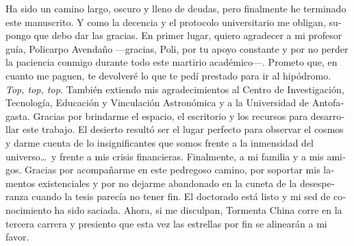 \begin{otherlanguage}{spanish}
Ha sido un camino largo, oscuro y lleno de deudas, pero finalmente he terminado este manuscrito. Y como la decencia y el protocolo universitario me obligan, supongo que debo dar las gracias.
En primer lugar, quiero agradecer a mi profesor guía, Policarpo Avendaño ---gracias, Poli, por tu apoyo constante y por no perder la paciencia conmigo durante todo este martirio académico---. Prometo que, en cuanto me paguen, te devolveré lo que te pedí prestado para ir al hipódromo. \textit{Top, top, top.}
También extiendo mis agradecimientos al Centro de Investigación, Tecnología, Educación y Vinculación Astronómica y a la Universidad de Antofagasta. Gracias por brindarme el espacio, el escritorio y los recursos para desarrollar este trabajo. El desierto resultó ser el lugar perfecto para observar el cosmos y darme cuenta de lo insignificantes que somos frente a la inmensidad del universo\dots\ y frente a mis crisis financieras.
Finalmente, a mi familia y a mis amigos. Gracias por acompañarme en este pedregoso camino, por soportar mis lamentos existenciales y por no dejarme abandonado en la cuneta de la desesperanza cuando la tesis parecía no tener fin.
El doctorado está listo y mi sed de conocimiento ha sido saciada. Ahora, si me disculpan, Tormenta China corre en la tercera carrera y presiento que esta vez las estrellas por fin se alinearán a mi favor.
\end{otherlanguage}
